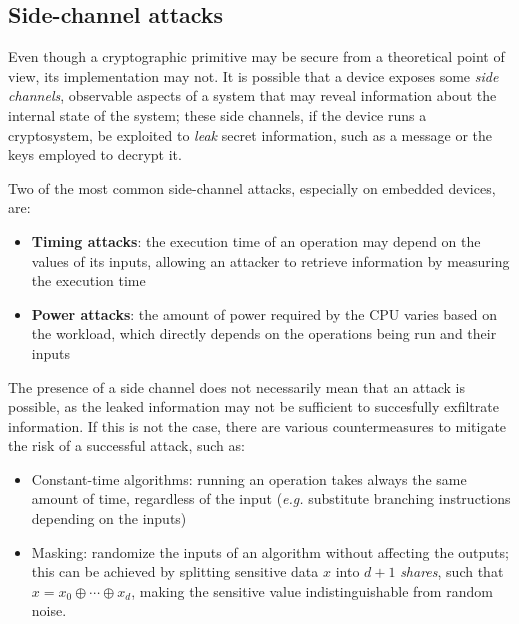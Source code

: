 \documentclass[11pt,a4paper,twocolumn]{article}
\theoremstyle{definition}
\begin{document}
\subsection{Side-channel attacks}
Even though a cryptographic primitive may be secure from a theoretical point of view, 
its implementation may not. It is possible that a device exposes some \emph{side channels}, 
observable aspects of a system that may reveal information about the internal state of the system;
these side channels, if the device runs a cryptosystem, be exploited to \emph{leak} secret information, such
as a message or the keys employed to decrypt it.

Two of the most common side-channel attacks, especially on embedded devices, are:
\begin{itemize}
    \item \textbf{Timing attacks}: the execution time of an operation may depend on the values of its inputs, allowing
    an attacker to retrieve information by measuring the execution time
    \item \textbf{Power attacks}: the amount of power required by the CPU varies based on the workload, which directly
    depends on the operations being run and their inputs
\end{itemize}

The presence of a side channel does not necessarily mean that an attack is possible,
as the leaked information may not be sufficient to succesfully exfiltrate information.
If this is not the case, there are various countermeasures to mitigate the risk of a successful attack,
such as:

\begin{itemize}
    \item Constant-time algorithms: running an operation takes always the same amount of time, regardless of the
    input (\emph{e.g.} substitute branching instructions depending on the inputs)
    \item Masking: randomize the inputs of an algorithm without affecting the outputs; this can be achieved by
    splitting sensitive data $x$ into $d+1$ \emph{shares}, such that $x = x_0 \oplus \cdots \oplus x_d$,
    making the sensitive value indistinguishable from random noise.
\end{itemize}
\end{document}
